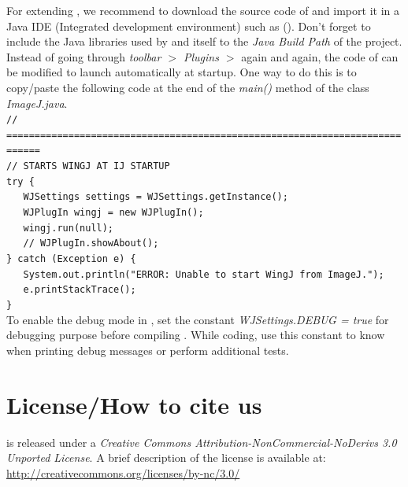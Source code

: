 For extending \wingj, we recommend to download the source code of \ij and import it in a Java IDE (Integrated development environment) such as \eclipse (\eclipseWebsite). Don't forget to include the Java libraries used by \wingj and \wingjJar itself to the \textit{Java Build Path} of the \ij project. Instead of going through \textit{\ij toolbar $>$ Plugins $>$ \wingj} again and again, the code of \ij can be modified to launch automatically \wingj at \ij startup. One way to do this is to copy/paste the following code at the end of the \emph{main()} method of the \ij class \textit{ImageJ.java}.\\

\footnotesize\texttt{// ============================================================================\\
// STARTS WINGJ AT IJ STARTUP\\
try \{ \\
\indent \ \ \ WJSettings settings = WJSettings.getInstance();\\
\indent \ \ \ WJPlugIn wingj = new WJPlugIn();\\
\indent \ \ \ wingj.run(null);\\
\indent \ \ \ // WJPlugIn.showAbout();\\
\} catch (Exception e) \{\\
\indent \ \ \ System.out.println("ERROR: Unable to start WingJ from ImageJ.");\\
\indent \ \ \ e.printStackTrace();\\
\}}\normalsize\\

To enable the debug mode in \wingj, set the constant \textit{WJSettings.DEBUG = true} for debugging purpose before compiling \wingj. While coding, use this constant to know when printing debug messages or perform additional tests.

\section{License/How to cite us}
\wingj is released under a \textit{Creative Commons Attribution-NonCommercial-NoDerivs 3.0 Unported License}. A brief description of the license is available at:\\

\href{http://creativecommons.org/licenses/by-nc/3.0/}{http://creativecommons.org/licenses/by-nc/3.0/}\\

